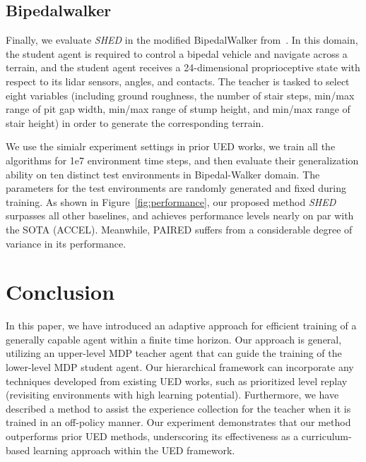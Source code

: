\documentclass{article}
\newcommand\algo{\emph{SHED }}
\begin{document}
\subsection{Bipedalwalker}
Finally, we evaluate \algo in the modified BipedalWalker from~\citet{parker2022evolving}. In this domain, the student agent is required to control a bipedal vehicle and navigate across a terrain, and the student agent receives a 24-dimensional proprioceptive state with respect to its lidar sensors, angles, and contacts. The teacher is tasked to select eight
variables (including ground roughness, the number of stair
steps, min/max range of pit gap width, min/max range of
stump height, and min/max range of stair height) in order to generate the corresponding terrain. 

We use the simialr experiment settings in prior UED works, we
train all the algorithms for 1e7 environment time steps, and then evaluate their generalization ability on ten distinct
test environments in Bipedal-Walker domain. The parameters for the test environments are randomly generated and fixed during training. As shown in Figure~\ref{fig:performance}, our proposed method
\algo  surpasses all other baselines, and achieves performance levels nearly on par with the SOTA (ACCEL). Meanwhile,  PAIRED suffers from a considerable degree of variance in its performance.

\section{Conclusion}
In this paper, we have introduced an adaptive approach for efficient training of a generally capable agent within a finite time horizon. Our approach is general, utilizing an upper-level MDP teacher agent that can guide the training of the lower-level MDP student agent. Our hierarchical framework can incorporate any techniques developed from existing UED works, such as prioritized level replay (revisiting environments with high learning potential). Furthermore, we have described a method to assist the experience collection for the teacher when it is trained in an off-policy manner. Our experiment demonstrates that our method outperforms prior UED methods, underscoring its effectiveness as a curriculum-based learning approach within the UED framework.
\end{document}
